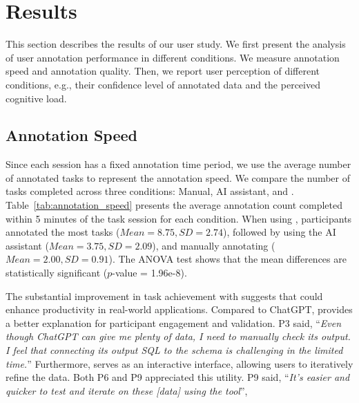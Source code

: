 \section{Results}

This section describes the results of our user study. 
We first present the analysis of user annotation performance in different conditions. We measure annotation speed and annotation quality.
Then, we report user perception of different conditions, e.g., their confidence level of annotated data and the perceived cognitive load. 

\subsection{Annotation Speed}

\begin{table}[htb]
    \centering
    \caption{Number of Annotated Data (5 minutes)}
    \vspace{-2.5mm}
    \label{tab:annotation_speed}
\end{table}


Since each session has a fixed annotation time period, we use the average number of annotated tasks to represent the annotation speed. 
We compare the number of tasks completed across three conditions: Manual, AI assistant, and {\tool}. Table~\ref{tab:annotation_speed} presents the average annotation count completed within 5 minutes of the task session for each condition.
When using {\tool}, participants annotated the most tasks ($Mean = 8.75, SD = 2.74$), followed by using the AI assistant ($Mean = 3.75, SD = 2.09$), and manually annotating ($Mean = 2.00, SD = 0.91$). The ANOVA test shows that the mean differences are statistically significant ($p$-value = 1.96e-8).

The substantial improvement in task achievement with {\tool} suggests that {\tool} could enhance productivity in real-world applications.
Compared to ChatGPT, {\tool} provides a better explanation for participant engagement and validation.
P3 said, ``\textit{Even though ChatGPT can give me plenty of data, I need to manually check its output. I feel that connecting its output SQL to the schema is challenging in the limited time.}''
Furthermore, {\tool} serves as an interactive interface, allowing users to iteratively refine the data.
Both P6 and P9 appreciated this utility.
P9 said, ``\textit{It's easier and quicker to test and iterate on these [data] using the tool}'',


